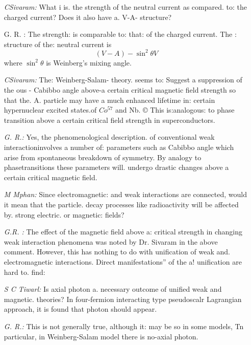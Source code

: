 \begin{enumerate}
  \item[{\it CSivaram: }] What i is. the strength of the neutral current as compared. to: the charged
current? Does it also have a. V-A- structure? 
\item[{G. R. :}] The strength: is comparable to: that: of the charged current. The
: structure of the: neutral current is 
$$
(V-A)-\sin^{2}\theta V
$$
where $\sin^{2} \theta$ is Weinberg's mixing angle.

\item[{\it CSivaram: }] The: Weinberg-Salam- theory. seems to: Suggest a suppression of the
ous - Cabibbo angle above-a certain critical magnetic field strength so that the.
A. particle may have a much enhanced lifetime in: certain hypernuclear
excited states.of $Co^{57}$ and Nb. © This is:analogous: to phase transition
above a certain critical field strength in superconductors. 

\item[{\it G. R.: }] Yes, the phenomenological description. of conventional weak interactioninvolves a number of: parameters such as Cabibbo angle which arise
from spontaneous breakdown of symmetry. By analogy to phasetransitions these parameters will. undergo drastic changes above a certain critical magnetic field. 
 
\item[{\it M Mphan: }]  Since electromagnetic: and weak interactions are connected, would it
mean that the particle. decay processes like radioactivity will be affected
by. strong electric. or magnetic: fields? 

\item[{\it G.R. :}] The effect of the magnetic field above a: critical strength in changing
weak interaction phenomena was noted by Dr. Sivaram in the above 
comment. However, this has nothing to do with unification of weak
and. electromagnetic interactions. Direct manifestations” of the
a! unification are hard to. find: 

\item[{\it S C Tiwarl:}] Is axial photon a. necessary outcome of unified weak and 
magnetic. theories? In four-fermion interacting type pseudoscalr
Lagrangian approach, it is found that photon should appear. 

\item[{\it G. R.:}] This is not generally true, although it: may be so in some models, Tn
particular, in Weinberg-Salam model there is no-axial photon. 


\end{enumerate}
